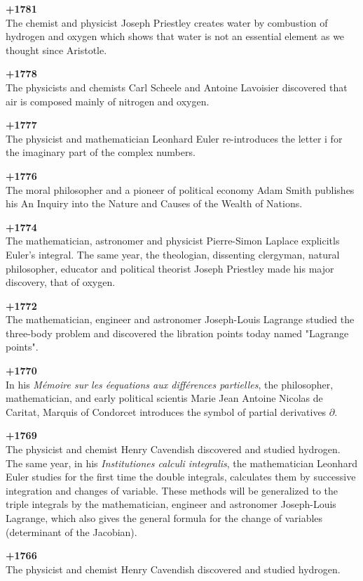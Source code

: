 \textbf{+1781}\\
The chemist and physicist Joseph Priestley creates water by combustion of hydrogen and oxygen which shows that water is not an essential element as we thought since Aristotle.

\textbf{+1778}\\
The physicists and chemists Carl Scheele and Antoine Lavoisier discovered that air is composed mainly of nitrogen and oxygen.

\textbf{+1777}\\
The physicist and mathematician Leonhard Euler re-introduces the letter $\mathrm{i}$ for the imaginary part of the complex numbers.

\textbf{+1776}\\
The moral philosopher and a pioneer of political economy Adam Smith publishes his An Inquiry into the Nature and Causes of the Wealth of Nations.

\textbf{+1774}\\
The mathematician, astronomer and physicist Pierre-Simon Laplace explicitls Euler's integral. The same year, the theologian, dissenting clergyman, natural philosopher, educator and political theorist Joseph Priestley made his major discovery, that of oxygen.

\textbf{+1772}\\
The mathematician, engineer and astronomer Joseph-Louis Lagrange studied the three-body problem and discovered the libration points today named "Lagrange points".

\textbf{+1770}\\
In his \textit{Mémoire sur les éequations aux différences partielles}, the philosopher, mathematician, and early political scientis Marie Jean Antoine Nicolas de Caritat, Marquis of Condorcet introduces the symbol of partial derivatives $\partial$.

\textbf{+1769}\\
The physicist and chemist Henry Cavendish discovered and studied hydrogen. The same year, in his \textit{Institutiones calculi integralis}, the mathematician Leonhard Euler studies for the first time the double integrals, calculates them by successive integration and changes of variable. These methods will be generalized to the triple integrals by the mathematician, engineer and astronomer Joseph-Louis Lagrange, which also gives the general formula for the change of variables (determinant of the Jacobian).

\textbf{+1766}\\
The physicist and chemist Henry Cavendish discovered and studied hydrogen.

